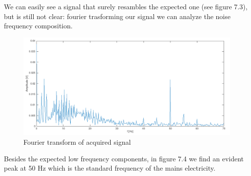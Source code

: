 We can easily see a signal that surely resambles the expected one (see figure 7.3), but is still  not clear: fourier trasforming our signal we can analyze the noise frequency composition.
\begin{figure}[H]
\centering
\includegraphics[width=.7\textwidth]{8/fft.png}
\caption{Fourier transform of acquired signal}
\end{figure}
Besides the expected low frequency components, in figure 7.4 we find an evident peak at 50 Hz which is the standard frequency of the mains electricity.
